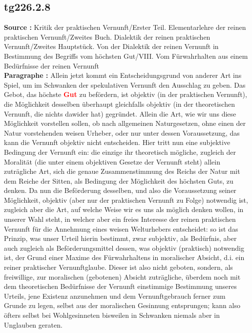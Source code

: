 \documentclass[a4paper,12pt,twoside]{book}
\newcommand{\match}[1]{\textcolor{red}{\textbf{#1}}}
\begin{document}
	\subsection*{tg226.2.8} 
	\textbf{Source : }Kritik der praktischen Vernunft/Erster Teil. Elementarlehre der reinen praktischen Vernunft/Zweites Buch. Dialektik der reinen praktischen Vernunft/Zweites Hauptstück. Von der Dialektik der reinen Vernunft in Bestimmung des Begriffs vom höchsten Gut/VIII. Vom Fürwahrhalten aus einem Bedürfnisse der reinen Vernunft\\  
	
	\noindent\textbf{Paragraphe : }Allein jetzt kommt ein Entscheidungsgrund von anderer Art ins Spiel, um im Schwanken der spekulativen Vernunft den Ausschlag zu geben. Das Gebot, das höchste \match{Gut} zu befördern, ist objektiv (in der praktischen Vernunft), die Möglichkeit desselben überhaupt gleichfalls objektiv (in der theoretischen Vernunft, die nichts dawider hat) gegründet. Allein die Art, wie wir uns diese Möglichkeit vorstellen sollen, ob nach allgemeinen Naturgesetzen, ohne einen der Natur vorstehenden weisen Urheber, oder nur unter dessen Voraussetzung, das kann die Vernunft objektiv nicht entscheiden. Hier tritt nun eine subjektive Bedingung der Vernunft ein: die einzige ihr theoretisch mögliche, zugleich der Moralität (die unter einem objektiven Gesetze der Vernunft steht) allein zuträgliche Art, sich die genaue Zusammenstimmung des Reichs der Natur mit dem Reiche der Sitten, als Bedingung der Möglichkeit des höchsten Guts, zu denken. Da nun die Beförderung desselben, und also die Voraussetzung seiner Möglichkeit, objektiv (aber nur der praktischen Vernunft zu Folge) notwendig ist, zugleich aber die Art, auf welche Weise wir es uns als möglich denken wollen, in unserer Wahl steht, in welcher aber ein freies Interesse der reinen praktischen Vernunft für die Annehmung eines weisen Welturhebers entscheidet: so ist das Prinzip, was unser Urteil hierin bestimmt, zwar subjektiv, als Bedürfnis, aber auch zugleich als Beförderungsmittel dessen, was objektiv (praktisch) notwendig ist, der Grund einer Maxime des Fürwahrhaltens in moralischer Absicht, d.i. ein reiner praktischer Vernunftglaube. Dieser ist also nicht geboten, sondern, als freiwillige, zur moralischen (gebotenen) Absicht zuträgliche, überdem noch mit dem theoretischen Bedürfnisse der Vernunft einstimmige Bestimmung unseres Urteils, jene Existenz anzunehmen  und dem Vernunftgebrauch ferner zum Grunde zu legen, selbst aus der moralischen Gesinnung entsprungen; kann also öfters selbst bei Wohlgesinneten bisweilen in Schwanken niemals aber in Unglauben geraten. 
	
\end{document}
